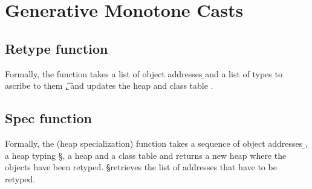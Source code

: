 \documentclass[a4paper,USenglish]{tex/lipics-v2016}
\begin{document}


\normalsize

\section{Generative Monotone Casts}

\subsection{Retype function}\label{retype}

Formally, the  function takes a list of object
addresses \b\a and a list of types to ascribe to them \b\t, and updates the
heap \s and class table \K. 

\begin{mathpar}


\end{mathpar}

\subsection{Spec function}\label{mono:spec}

Formally, the  (heap specialization) function takes a
sequence of object addresses \b\a, a heap typing \S, a heap \s
and a class table \K and returns a new heap where the objects
have been retyped. \Dom\S retrieves the list of addresses 
that have to be retyped.
\end{document}
